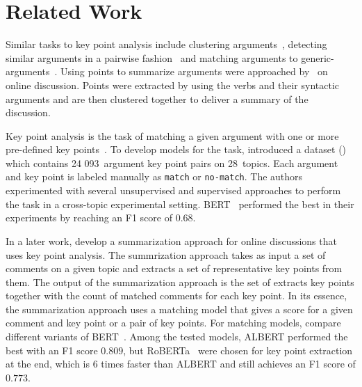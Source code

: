 \section{Related Work}\label{related-work}





Similar tasks to key point analysis include clustering arguments~\cite{reimers2019classification,ajjour2019modeling}, detecting similar arguments in a pairwise fashion~\cite{misra:2016} and matching arguments to generic-arguments~\cite{naderi:2017}. Using points to summarize arguments were approached by~\citet{egan2016summarising} on online discussion. Points were extracted by using the verbs and their syntactic arguments and are then clustered together to deliver a summary of the discussion. 

Key point analysis is the task of matching a given argument with one or more pre-defined key points~\cite{Bar-HaimEFKLS2020}. To develop models for the task, \citet{Bar-HaimEFKLS2020} introduced a dataset (\ArgKP) which contains 24 093~argument key point pairs on 28~topics. Each argument and key point is labeled manually as \texttt{match} or \texttt{no-match}. The authors experimented with several unsupervised and supervised approaches to perform the task in a cross-topic experimental setting. BERT~\cite{DevlinCLT2019} performed the best in their experiments by reaching an F1 score of $0.68$.

In a later work, \citet{Bar-HaimKEFLS2020} develop a summarization approach for online discussions that
uses key point analysis. The summrization approach takes as input a set of comments on a given topic and extracts a set of representative key points from them. The output of the summarization approach is the set of extracts key points together with the count of matched comments for each key point. In its essence, the summarization approach uses a matching model that gives a score for a given comment and key point or a pair of key points. For matching models, \citet{Bar-HaimKEFLS2020} compare different variants of BERT~\cite{DevlinCLT2019}. Among the tested models, ALBERT \cite{lan2019albert} performed the best with an F1 score $0.809$, but RoBERTa~\cite{LiuOGDJCLLZS2019} were chosen for key point extraction at the end, which is 6 times faster than ALBERT and still achieves an F1 score of $0.773$. 

